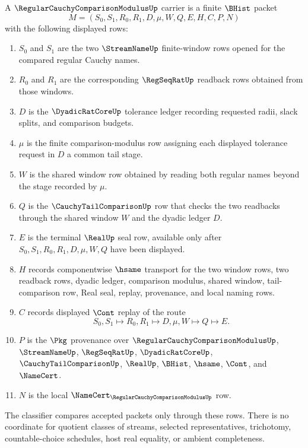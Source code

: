 \begin{definition}
\label{def:regular-cauchy-comparison-modulus-carrier}
A $\RegularCauchyComparisonModulusUp$ carrier is a finite $\BHist$ packet
$$
M=(S_0,S_1,R_0,R_1,D,\mu,W,Q,E,H,C,P,N)
$$
with the following displayed rows:
\begin{enumerate}
\item $S_0$ and $S_1$ are the two $\StreamNameUp$ finite-window rows opened for the compared regular Cauchy names.
\item $R_0$ and $R_1$ are the corresponding $\RegSeqRatUp$ readback rows obtained from those windows.
\item $D$ is the $\DyadicRatCoreUp$ tolerance ledger recording requested radii, slack splits, and comparison budgets.
\item $\mu$ is the finite comparison-modulus row assigning each displayed tolerance request in $D$ a common tail stage.
\item $W$ is the shared window row obtained by reading both regular names beyond the stage recorded by $\mu$.
\item $Q$ is the $\CauchyTailComparisonUp$ row that checks the two readbacks through the shared window $W$ and the dyadic ledger $D$.
\item $E$ is the terminal $\RealUp$ seal row, available only after $S_0,S_1,R_0,R_1,D,\mu,W,Q$ have been displayed.
\item $H$ records componentwise $\hsame$ transport for the two window rows, two readback rows, dyadic ledger, comparison modulus, shared window, tail-comparison row, Real seal, replay, provenance, and local naming rows.
\item $C$ records displayed $\Cont$ replay of the route
$$
S_0,S_1 \longmapsto R_0,R_1 \longmapsto D,\mu,W \longmapsto Q \longmapsto E .
$$
\item $P$ is the $\Pkg$ provenance over $\RegularCauchyComparisonModulusUp$, $\StreamNameUp$, $\RegSeqRatUp$, $\DyadicRatCoreUp$, $\CauchyTailComparisonUp$, $\RealUp$, $\BHist$, $\hsame$, $\Cont$, and $\NameCert$.
\item $N$ is the local $\NameCert_{\RegularCauchyComparisonModulusUp}$ row.
\end{enumerate}
The classifier compares accepted packets only through these rows. There is no coordinate for quotient classes of streams, selected representatives, trichotomy, countable-choice schedules, host real equality, or ambient completeness.
\end{definition}


